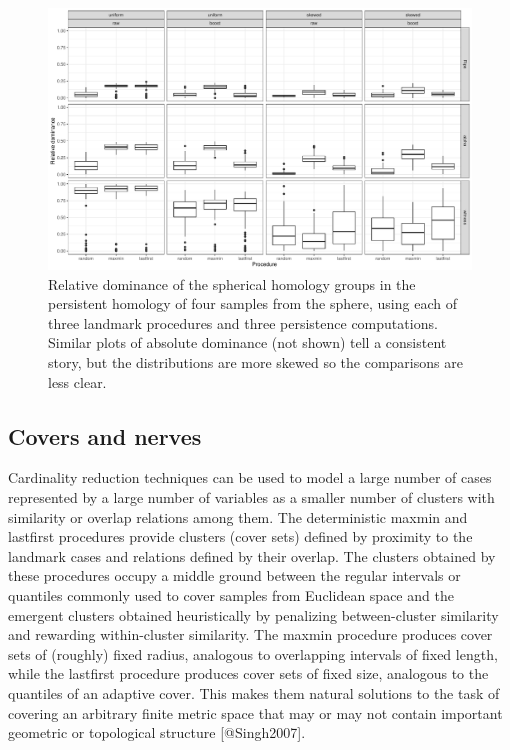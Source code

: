 \documentclass[
]{article}
\begin{document}
\begin{figure}
\includegraphics[width=\textwidth]{../figures/homology-sphere-relative}
\caption{
Relative dominance of the spherical homology groups in the persistent homology of four samples from the sphere, using each of three landmark procedures and three persistence computations. Similar plots of absolute dominance (not shown) tell a consistent story, but the distributions are more skewed so the comparisons are less clear.
\label{fig:sphere}
}
\end{figure}

\hypertarget{covers-and-nerves}{%
\subsection{Covers and nerves}\label{covers-and-nerves}}

Cardinality reduction techniques can be used to model a large number of
cases represented by a large number of variables as a smaller number of
clusters with similarity or overlap relations among them. The
deterministic maxmin and lastfirst procedures provide clusters (cover
sets) defined by proximity to the landmark cases and relations defined
by their overlap. The clusters obtained by these procedures occupy a
middle ground between the regular intervals or quantiles commonly used
to cover samples from Euclidean space and the emergent clusters obtained
heuristically by penalizing between-cluster similarity and rewarding
within-cluster similarity. The maxmin procedure produces cover sets of
(roughly) fixed radius, analogous to overlapping intervals of fixed
length, while the lastfirst procedure produces cover sets of fixed size,
analogous to the quantiles of an adaptive cover. This makes them natural
solutions to the task of covering an arbitrary finite metric space that
may or may not contain important geometric or topological structure
{[}@Singh2007{]}.
\end{document}
